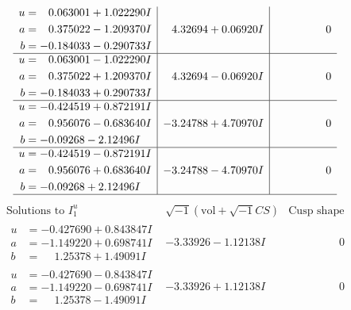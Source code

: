 \documentclass[1p]{elsarticle_modified}
\theoremstyle{definition}
\newcommand{\I}{\sqrt{-1}}
\begin{document}
$$\begin{array}{c|c|c}
\begin{aligned}
u &= \phantom{-}0.063001 + 1.022290 I \\
a &= \phantom{-}0.375022 - 1.209370 I \\
b &= -0.184033 - 0.290733 I\end{aligned}
 & \phantom{-}4.32694 + 0.06920 I & \phantom{-0.000000 } 0 \\ \hline\begin{aligned}
u &= \phantom{-}0.063001 - 1.022290 I \\
a &= \phantom{-}0.375022 + 1.209370 I \\
b &= -0.184033 + 0.290733 I\end{aligned}
 & \phantom{-}4.32694 - 0.06920 I & \phantom{-0.000000 } 0 \\ \hline\begin{aligned}
u &= -0.424519 + 0.872191 I \\
a &= \phantom{-}0.956076 - 0.683640 I \\
b &= -0.09268 - 2.12496 I\end{aligned}
 & -3.24788 + 4.70970 I & \phantom{-0.000000 } 0 \\ \hline\begin{aligned}
u &= -0.424519 - 0.872191 I \\
a &= \phantom{-}0.956076 + 0.683640 I \\
b &= -0.09268 + 2.12496 I\end{aligned}
 & -3.24788 - 4.70970 I & \phantom{-0.000000 } 0\\
 \hline 
 \end{array}$$\newpage$$\begin{array}{c|c|c}  
\text{Solutions to }I^u_{1}& \I (\text{vol} + \sqrt{-1}CS) & \text{Cusp shape}\\
 \hline 
\begin{aligned}
u &= -0.427690 + 0.843847 I \\
a &= -1.149220 + 0.698741 I \\
b &= \phantom{-}1.25378 + 1.49091 I\end{aligned}
 & -3.33926 - 1.12138 I & \phantom{-0.000000 } 0 \\ \hline\begin{aligned}
u &= -0.427690 - 0.843847 I \\
a &= -1.149220 - 0.698741 I \\
b &= \phantom{-}1.25378 - 1.49091 I\end{aligned}
 & -3.33926 + 1.12138 I & \phantom{-0.000000 } 0 \\ \hline\begin{aligned}

\end{aligned}
\end{array}$$
\end{document}
